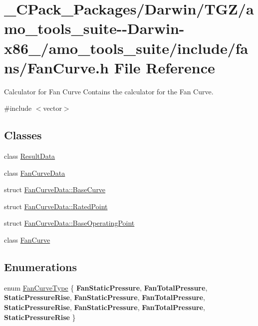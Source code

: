 \hypertarget{___c_pack___packages_2_darwin_2_t_g_z_2amo__tools__suite--_darwin-x86__64_2amo__tools__suite_2include_2fans_2_fan_curve_8h}{}\section{\+\_\+\+C\+Pack\+\_\+\+Packages/\+Darwin/\+T\+G\+Z/amo\+\_\+tools\+\_\+suite-\/-\/\+Darwin-\/x86\+\_/amo\+\_\+tools\+\_\+suite/include/fans/\+Fan\+Curve.h File Reference}
\label{___c_pack___packages_2_darwin_2_t_g_z_2amo__tools__suite--_darwin-x86__64_2amo__tools__suite_2include_2fans_2_fan_curve_8h}


Calculator for Fan Curve Contains the calculator for the Fan Curve.  


{\ttfamily \#include $<$vector$>$}\newline
\subsection*{Classes}
\begin{DoxyCompactItemize}
\item 
class \hyperlink{class_result_data}{Result\+Data}
\item 
class \hyperlink{class_fan_curve_data}{Fan\+Curve\+Data}
\item 
struct \hyperlink{struct_fan_curve_data_1_1_base_curve}{Fan\+Curve\+Data\+::\+Base\+Curve}
\item 
struct \hyperlink{struct_fan_curve_data_1_1_rated_point}{Fan\+Curve\+Data\+::\+Rated\+Point}
\item 
struct \hyperlink{struct_fan_curve_data_1_1_base_operating_point}{Fan\+Curve\+Data\+::\+Base\+Operating\+Point}
\item 
class \hyperlink{class_fan_curve}{Fan\+Curve}
\end{DoxyCompactItemize}
\subsection*{Enumerations}
\begin{DoxyCompactItemize}
\item 
enum \hyperlink{___c_pack___packages_2_darwin_2_t_g_z_2amo__tools__suite--_darwin-x86__64_2amo__tools__suite_2include_2fans_2_fan_curve_8h_a5c9bed68c43ea99f4baf31c4a4cdd0fa}{Fan\+Curve\+Type} \{ \newline
{\bfseries Fan\+Static\+Pressure}, 
{\bfseries Fan\+Total\+Pressure}, 
{\bfseries Static\+Pressure\+Rise}, 
{\bfseries Fan\+Static\+Pressure}, 
\newline
{\bfseries Fan\+Total\+Pressure}, 
{\bfseries Static\+Pressure\+Rise}, 
{\bfseries Fan\+Static\+Pressure}, 
{\bfseries Fan\+Total\+Pressure}, 
\newline
{\bfseries Static\+Pressure\+Rise}
 \}
\end{DoxyCompactItemize}


